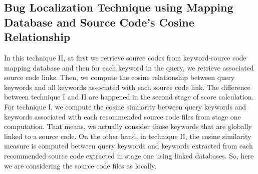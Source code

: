 \documentclass{sig-alternate}
\begin{document}


\subsection{Bug Localization Technique using Mapping Database and Source Code's Cosine Relationship}
In this technique II, at first we retrieve source codes from keyword-source code mapping database and then for each keyword in the query, we retrieve associated source code links. Then,
we compute the cosine relationship between query keywords and all keywords associated with each source code link. The difference between technique I and II are happened in the second stage of score calculation. For technique I, we compute the cosine similarity between query keywords and keywords associated with each recommended source code files from stage one computation. That means, we actually consider those keywords that are globally linked to a source code. On the other hand, in technique II, the cosine similarity measure is computed between query keywords and keywords extracted from each recommended source code extracted in stage one using linked databases. So, here we are considering the source code files as locally. 
\end{document}
